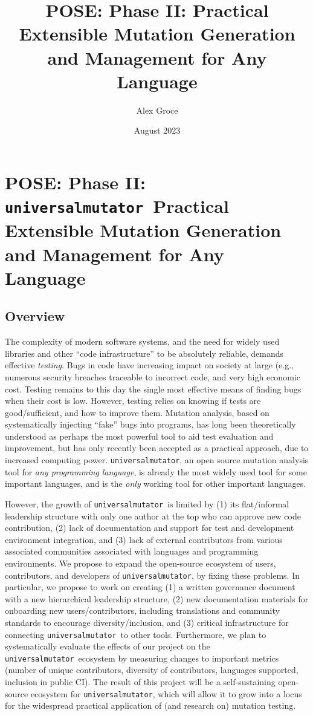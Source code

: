 \documentclass[numbers]{proposalnsf}
\title{POSE: Phase II: Practical Extensible Mutation Generation and Management for Any Language}
\author{Alex Groce }
\date{August 2023}
\newcommand{\um}{\texttt{universalmutator}}
\begin{document}
\section*{POSE: Phase II: \um\ Practical Extensible Mutation Generation and Management for Any Language}

\subsection*{Overview}
\vspace{-2mm}

The complexity of modern software systems, and the need for widely used libraries and other ``code infrastructure'' to be absolutely reliable, demands effective \emph{testing}.  Bugs in code have increasing impact on society at large (e.g., numerous security breaches traceable to incorrect code, and very high economic cost.  Testing remains to this day the single most effective means of finding bugs when their cost is low.  However, testing relies on knowing if tests are good/sufficient, and how to improve them.  Mutation analysis, based on systematically injecting ``fake'' bugs into programs, has long been theoretically understood as perhaps the most powerful tool to aid test evaluation and improvement, but has only recently been accepted as a practical approach, due to increased computing power.  \um, an open source mutation analysis tool for \emph{any programming language}, is already the most widely used tool for some important languages, and is the \emph{only} working tool for other important languages.

However, the growth of \um\ is limited by (1) its flat/informal leadership structure with only one author at the top who can approve new code contribution,  (2) lack of documentation and support for test and development environment integration, and (3) lack of external contributors from various associated communities associated with languages and programming environments.
We propose to expand the open-source ecosystem of users, contributors, and developers of \um, by fixing these problems.
In particular, we propose to work on creating (1) a written governance document with a new hierarchical leadership structure, (2) new documentation materials for onboarding new users/contributors, including translations and community standards to encourage diversity/inclusion, and (3) critical infrastructure for connecting \um\ to other tools.  Furthermore, we plan to systematically evaluate the effects of our project on the \um\ ecosystem by measuring changes to important metrics (number of unique contributors, diversity of contributors, languages supported, inclusion in public CI). 
The result of this project will be a self-sustaining open-source ecosystem for \um, which will allow it to grow into a locus for the widespread practical application of (and research on) mutation testing.
\end{document}

